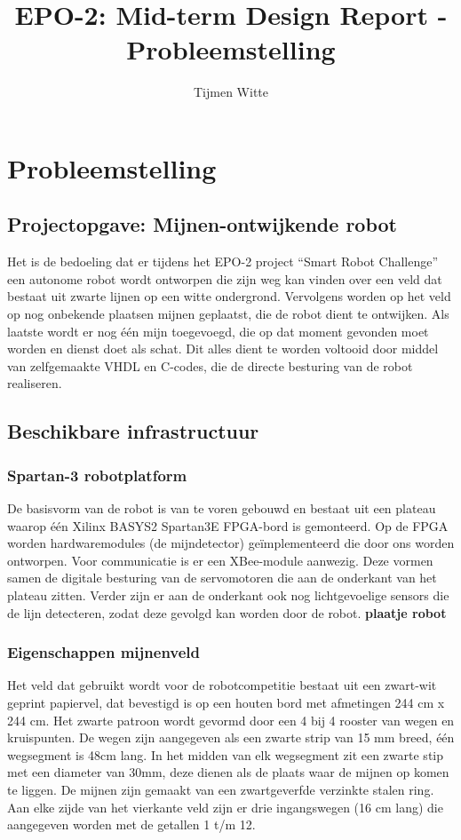 \documentclass{report}
\title{EPO-2: Mid-term Design Report - Probleemstelling}
\author{Tijmen Witte}
\begin{document}
\chapter{Probleemstelling}
\label{ch:probleem}

\section{Projectopgave: Mijnen-ontwijkende robot}

Het is de bedoeling dat er tijdens het EPO-2 project “Smart Robot Challenge” een autonome robot wordt ontworpen die zijn weg kan vinden over een veld dat bestaat uit zwarte lijnen op een witte ondergrond. Vervolgens worden op het veld op nog onbekende plaatsen mijnen geplaatst, die de robot dient te ontwijken. Als laatste wordt er nog één mijn toegevoegd, die op dat moment gevonden moet worden en dienst doet als schat. Dit alles dient te worden voltooid door middel van zelfgemaakte VHDL en C-codes, die de directe besturing van de robot realiseren. 

\section{Beschikbare infrastructuur}
\subsection{Spartan-3 robotplatform}

De basisvorm van de robot is van te voren gebouwd en bestaat uit een plateau waarop één Xilinx BASYS2 Spartan3E FPGA-bord is gemonteerd. Op de FPGA worden hardwaremodules (de mijndetector) geïmplementeerd die door ons worden ontworpen. Voor communicatie is er een XBee-module aanwezig. Deze vormen samen de digitale besturing van de servomotoren die aan de onderkant van het plateau zitten. Verder zijn er aan de onderkant ook nog lichtgevoelige sensors die de lijn detecteren, zodat deze gevolgd kan worden door de robot. 
\textbf{plaatje robot}

\subsection{Eigenschappen mijnenveld}

Het veld dat gebruikt wordt voor de robotcompetitie bestaat uit een zwart-wit geprint papiervel, dat bevestigd is op een houten bord met afmetingen 244 cm x 244 cm. Het zwarte patroon wordt gevormd door een 4 bij 4 rooster van wegen en kruispunten. De wegen zijn aangegeven als een zwarte strip van 15 mm breed, één wegsegment is 48cm lang. In het midden van elk wegsegment zit een zwarte stip met een diameter van 30mm, deze dienen als de plaats waar de mijnen op komen te liggen. De mijnen zijn gemaakt van een zwartgeverfde verzinkte stalen ring. Aan elke zijde van het vierkante veld zijn er drie ingangswegen (16 cm lang) die aangegeven worden met de getallen 1 t/m 12.
\end{document}
